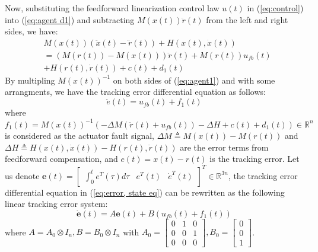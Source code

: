\documentclass[journal,12pt,onecolumn,draftclsnofoot,]{IEEEtran}
\newtheorem{remark}{Remark}
\begin{document}
Now, substituting the feedforward linearization control law $u(t)$ in (\ref{eq:control}) into (\ref{eq:agent d1}) and subtracting $M(x(t))\ddot{r}(t)$ from the left and right sides, we have:
\begin{equation} \label{eq:agent1}
    \begin{split}
        & M(x(t))(\ddot{x}(t)-\ddot{r}(t)) + H(x(t),\dot{x}(t)) \\
        & =(M(r(t))-M(x(t)))\ddot{r}(t) + M(r(t))u_{fb}(t) \\
        & + H(r(t),\dot{r}(t)) + c(t) + d_1(t)
    \end{split}
\end{equation}
By multipling $M(x(t))^{-1}$ on both sides of (\ref{eq:agent1}) and with some arrangments, we have the tracking error differential equation as follows:
\begin{equation} \label{eq:error, state eq}
    \ddot{e}(t) = u_{fb}(t) + f_1(t)
\end{equation}
where $f_1(t) = M(x(t))^{-1}(-\Delta M (\ddot{r}(t)+u_{fb}(t)) -\Delta H + c(t) + d_1(t))\in\mathbb{R}^n$ is considered as the actuator fault signal, $\Delta M \triangleq M(x(t)) - M(r(t))$ and $ \Delta H \triangleq H(x(t),\dot{x}(t)) - H(r(t),\dot{r}(t))$ are the error terms from feedforward compensation, and $e(t)= x(t)-r(t)$ is the tracking error.
Let us denote $\pmb{e}(t)=\begin{bmatrix}
    \int_{0}^{t}e^T(\tau)d\tau & e^T(t) & \dot{e}^T(t)
\end{bmatrix}^T\in\mathbb{R}^{3n}$, the tracking error differential equation in (\ref{eq:error, state eq}) can be rewritten as the following linear tracking error system:
\begin{equation} \label{eq:linear f1}
    \dot{\pmb{e}}(t)=A\pmb{e}(t)+B(u_{fb}(t)+f_1(t))
\end{equation}
where $ A = A_0\otimes I_n, B = B_0\otimes I_n$
with $A_0 = \begin{bmatrix}
    0 & 1 & 0 \\ 0 & 0 & 1 \\ 0 & 0 & 0
\end{bmatrix}, B_0 = \begin{bmatrix}
0 \\ 0 \\ 1
\end{bmatrix}$. 
\end{document}
